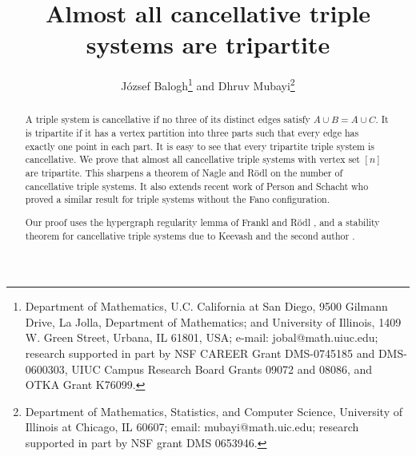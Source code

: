 \documentclass[11pt]{article}
\begin{document}
\newtheorem{theorem}{Theorem}
\newtheorem{corollary}{Corollary}
\newtheorem{lemma}{Lemma}
\newtheorem{proposition}{Proposition}
\newtheorem{conjecture}{Conjecture}
\newcommand\eps{\varepsilon}

\newcommand{\brac}[1]{\left(#1\right)}
\newcommand{\bfrac}[2]{\brac{\frac{#1}{#2}}}
\newcommand{\rdown}[1]{\left\lfloor#1\right\rfloor}
\newcommand{\rdup}[1]{\left\lceil#1\right\rfloor}
\newcommand{\me}{\mathrm{e}}
\newcommand{\ee}{\epsilon}
\newcommand{\ex}{\mathrm{ex}}
\newcommand{\Bin}{\mathrm{Bin}}
\newcommand{\cG}{{{\cal G}}}
\newcommand{\cK}{{\cal K}}
\newcommand{\cH}{{\cal H}}
\newcommand{\cP}{{\cal P}}
\newcommand{\cJ}{{\cal J}}
\newcommand{\cE}{{\cal E}}
\def\Q{\mathcal{Q}}
\newtheorem{definition}[theorem]{Definition}
\def\FF{\mathcal{F}}
\def\F{\mathcal{F}}
\def\eps{\varepsilon}
\newcommand{\eee}{{\mathbb E}}
\def\HH{\mathcal{H}}
\parindent=0pt

\title{Almost all cancellative triple systems are tripartite}


\author{J\'ozsef Balogh\thanks{{Department of
Mathematics, U.C. California at San Diego, 9500 Gilmann Drive, La
Jolla, Department of Mathematics; and  University of Illinois, 1409
W. Green Street, Urbana, IL 61801, USA}; e-mail:
{jobal@math.uiuc.edu;} research  supported in part   by NSF CAREER
Grant DMS-0745185 and DMS-0600303, UIUC Campus Research Board Grants
09072 and 08086, and OTKA Grant K76099.}  \quad  and \quad Dhruv
Mubayi\thanks{Department of Mathematics, Statistics, and Computer
Science, University of Illinois at Chicago, IL 60607;  email:
mubayi@math.uic.edu; research  supported in part by  NSF grant DMS
0653946.}}

\maketitle

\vspace{-0.4in}

\begin{abstract}
A triple system is cancellative if  no three of its distinct edges satisfy $A \cup B=A \cup C$.
 It is tripartite if it has a vertex partition into three parts such that every edge has exactly one point in each part.
   It is easy to see that every tripartite triple system is cancellative. We prove that almost all cancellative triple systems with
    vertex set $[n]$ are tripartite. This sharpens a  theorem of Nagle and R\"odl \cite{NR} on the number of cancellative triple
     systems.  It also extends recent work of Person and Schacht \cite{PSch} who proved a similar result
      for triple systems without the Fano configuration.

Our proof  uses the  hypergraph regularity lemma of Frankl and R\"odl \cite{FR}, and a stability
theorem for cancellative triple systems  due to Keevash and the second author \cite{KM}.
\end{abstract}
\end{document}
